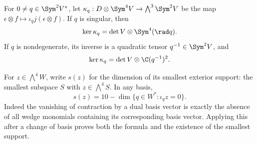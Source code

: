 

\begin{lemma}
\label{lem:schur-contraction-kernel}
For \(0\ne q\in\Sym^2V^*\), let
\(\kappa_q:D\otimes\Sym^4V\to\bigwedge^3\Sym^2V\)
be the map \(\epsilon\otimes f\mapsto\iota_qj(\epsilon\otimes f)\).  If \(q\) is singular, then
\begin{equation}\label{eq:singular-contraction-kernel}
 \ker\kappa_q=\det V\otimes\Sym^4(\rad q).
\end{equation}
If \(q\) is nondegenerate, its inverse is a quadratic tensor
\(q^{-1}\in\Sym^2V\), and
\begin{equation}\label{eq:nonsingular-contraction-kernel}
 \ker\kappa_q=\det V\otimes\C(q^{-1})^2.
\end{equation}
\end{lemma}


For \(z\in\bigwedge^4W\), write \(s(z)\) for the dimension
of its smallest exterior support: the smallest subspace \(S\)
with \(z\in\bigwedge^4S\).  In any basis,
\begin{equation}\label{eq:exterior-support-annihilator}
 s(z)=10-\dim\{q\in W^*: \iota_qz=0\}.
\end{equation}
Indeed the vanishing of contraction by a dual basis vector is exactly
the absence of all wedge monomials containing its corresponding
basis vector.  Applying this after a change of basis proves both the
formula and the existence of the smallest support.


